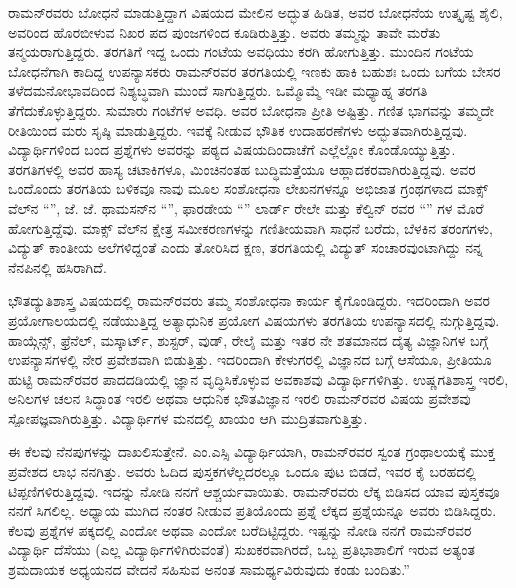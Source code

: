 ರಾಮನ್‍ರವರು ಬೋಧನೆ ಮಾಡುತ್ತಿದ್ದಾಗ ವಿಷಯದ ಮೇಲಿನ ಅದ್ಭುತ ಹಿಡಿತ, ಅವರ ಬೋಧನೆಯ ಉತ್ಕೃಷ್ಟ ಶೈಲಿ, ಅವರಿಂದ ಹೊರಬೀಳುವ ನಿಖರ ಪದ ಪುಂಜಗಳಿಂದ ಕೂಡಿರುತ್ತಿತ್ತು. ಅವರು ತಮ್ಮನ್ನು ತಾವೇ ಮರೆತು ತನ್ಮಯರಾಗುತ್ತಿದ್ದರು. ತರಗತಿಗೆ ಇದ್ದ ಒಂದು ಗಂಟೆಯ ಅವಧಿಯು ಕರಗಿ ಹೋಗುತ್ತಿತ್ತು. ಮುಂದಿನ ಗಂಟೆಯ ಬೋಧನೆಗಾಗಿ ಕಾದಿದ್ದ ಉಪನ್ಯಾಸಕರು ರಾಮನ್‍ರವರ ತರಗತಿಯಲ್ಲಿ ಇಣಕು ಹಾಕಿ ಬಹುಶಃ ಒಂದು ಬಗೆಯ ಬೇಸರ ತಳೆದ\break ಮನೋಭಾವದಿಂದ ನಿಶ್ಯಬ್ಧವಾಗಿ ಮುಂದೆ ಸಾಗುತ್ತಿದ್ದರು. ಒಮ್ಮೊಮ್ಮೆ ಇಡೀ ಮಧ್ಯಾಹ್ನ ತರಗತಿ ತೆಗೆದುಕೊಳ್ಳುತ್ತಿದ್ದರು. ಸುಮಾರು  ಗಂಟೆಗಳ ಅವಧಿ. ಅವರ ಬೋಧನಾ ಪ್ರೀತಿ ಅಷ್ಟಿತ್ತು. ಗಣಿತ ಭಾಗವನ್ನು ತಮ್ಮದೇ ರೀತಿಯಿಂದ ಮರು ಸೃಷ್ಠಿ ಮಾಡುತ್ತಿದ್ದರು. ಇವಕ್ಕೆ ನೀಡುವ ಭೌತಿಕ ಉದಾಹರಣೆಗಳು ಅದ್ಭುತವಾಗಿರುತ್ತಿದ್ದವು. ವಿದ್ಯಾರ್ಥಿಗಳಿಂದ ಬಂದ ಪ್ರಶ್ನೆಗಳು ಅವರನ್ನು ಪಠ್ಯದ ವಿಷಯದಿಂದಾಚೆಗೆ ಎಲ್ಲೆಲ್ಲೋ ಕೊಂಡೊಯ್ಯುತ್ತಿತ್ತು. ತರಗತಿಗಳಲ್ಲಿ ಅವರ ಹಾಸ್ಯ ಚಟಾಕಿಗಳೂ, ಮಿಂಚಿನಂತಹ ಬುದ್ಧಿಮತ್ತೆಯೂ ಆಹ್ಲಾದಕರವಾಗಿರುತ್ತಿದ್ದವು. ಅವರ ಒಂದೊಂದು ತರಗತಿಯ ಬಳಿಕವೂ ನಾವು ಮೂಲ ಸಂಶೋಧನಾ ಲೇಖನಗಳನ್ನೂ ಅಭಿಜಾತ ಗ್ರಂಥಗಳಾದ ಮಾಕ್ಸ್ ವೆಲ್‍ನ “”, ಜೆ. ಜೆ. ಥಾಮಸನ್‍ನ “”, ಫಾರಡೇಯ “” ಲಾರ್ಡ್ ರೇಲೇ ಮತ್ತು ಕೆಲ್ವಿನ್ ರವರ “” ಗಳ ಮೊರೆ ಹೋಗುತ್ತಿದ್ದೆವು. ಮಾಕ್ಸ್ ವೆಲ್‍ನ ಕ್ಷೇತ್ರ ಸಮೀಕರಣಗಳನ್ನು ಗಣಿತೀಯವಾಗಿ ಸಾಧನೆ ಬರೆದು, ಬೆಳಕಿನ ತರಂಗಗಳು, ವಿದ್ಯುತ್ ಕಾಂತೀಯ ಅಲೆಗಳಿದ್ದಂತೆ ಎಂದು ತೋರಿಸಿದ ಕ್ಷಣ, ತರಗತಿಯಲ್ಲಿ ವಿದ್ಯುತ್ ಸಂಚಾರವುಂಟಾಗಿದ್ದು ನನ್ನ ನೆನಪಿನಲ್ಲಿ ಹಸಿರಾಗಿದೆ.

ಭೌತದ್ಯುತಿಶಾಸ್ತ್ರ ವಿಷಯದಲ್ಲಿ ರಾಮನ್‍ರವರು ತಮ್ಮ ಸಂಶೋಧನಾ ಕಾರ್ಯ ಕೈಗೊಂಡಿದ್ದರು. ಇದರಿಂದಾಗಿ ಅವರ ಪ್ರಯೋಗಾಲಯದಲ್ಲಿ ನಡೆಯುತ್ತಿದ್ದ ಅತ್ಯಾಧುನಿಕ ಪ್ರಯೋಗ ವಿಷಯಗಳು ತರಗತಿಯ ಉಪನ್ಯಾಸದಲ್ಲಿ ನುಗ್ಗುತ್ತಿದ್ದವು. ಹಾಯ್ಗೆನ್ಸ್, ಫ್ರೆನೆಲ್, ಮಸ್ಕಾರ್ಟ್, ಶುಸ್ಟರ್, ವುಡ್, ರೇಲೈ ಮತ್ತು ಇತರ ನೇ ಶತಮಾನದ ದೈತ್ಯ ವಿಜ್ಞಾನಿಗಳ ಬಗ್ಗೆ ಉಪನ್ಯಾಸಗಳಲ್ಲಿ ನೇರ ಪ್ರವೇಶವಾಗಿ ಬಿಡುತ್ತಿತ್ತು. ಇದರಿಂದಾಗಿ ಕೇಳುಗರಲ್ಲಿ ವಿಜ್ಞಾನದ ಬಗ್ಗೆ ಆಸೆಯೂ, ಪ್ರೀತಿಯೂ ಹುಟ್ಟಿ ರಾಮನ್‍ರವರ ಪಾದದಡಿಯಲ್ಲಿ ಜ್ಞಾನ ವೃದ್ಧಿಸಿಕೊಳ್ಳುವ ಅವಕಾಶವು ವಿದ್ಯಾರ್ಥಿಗಳಿಗಿತ್ತು. ಉಷ್ಣಗತಿಶಾಸ್ತ್ರ ಇರಲಿ, ಅನಿಲಗಳ ಚಲನ ಸಿದ್ಧಾಂತ ಇರಲಿ ಅಥವಾ ಆಧುನಿಕ ಭೌತವಿಜ್ಞಾನ ಇರಲಿ ರಾಮನ್‍ರವರ ವಿಷಯ ಪ್ರವೇಶವು ಸ್ಪೋಪಜ್ಞವಾಗಿರುತ್ತಿತ್ತು. ವಿದ್ಯಾರ್ಥಿಗಳ ಮನದಲ್ಲಿ ಖಾಯಂ ಆಗಿ ಮುದ್ರಿತವಾಗುತ್ತಿತ್ತು.

ಈ ಕೆಲವು ನೆನಪುಗಳನ್ನು ದಾಖಲಿಸುತ್ತೇನೆ. ಎಂ.ಎಸ್ಸಿ ವಿದ್ಯಾರ್ಥಿಯಾಗಿ, ರಾಮನ್‍ರವರ ಸ್ವಂತ ಗ್ರಂಥಾಲಯಕ್ಕೆ ಮುಕ್ತ ಪ್ರವೇಶದ ಲಾಭ ನನಗಿತ್ತು. ಅವರು ಓದಿದ ಪುಸ್ತಕಗಳೆಲ್ಲದರಲ್ಲೂ ಒಂದೂ ಪುಟ ಬಿಡದೆ, ಇವರ ಕೈ ಬರಹದಲ್ಲಿ ಟಿಪ್ಪಣಿಗಳಿರುತ್ತಿದ್ದವು. ಇದನ್ನು ನೋಡಿ ನನಗೆ ಆಶ್ಚರ್ಯವಾಯಿತು. ರಾಮನ್‍ರವರು ಲೆಕ್ಕ ಬಿಡಿಸದ ಯಾವ ಪುಸ್ತಕವೂ ನನಗೆ ಸಿಗಲಿಲ್ಲ. ಅಧ್ಯಾಯ ಮುಗಿದ ನಂತರ ನೀಡುವ ಪ್ರತಿಯೊಂದು ಪ್ರಶ್ನೆ ಲೆಕ್ಕದ ಪ್ರಶ್ನೆಯನ್ನೂ ಅವರು ಬಿಡಿಸಿದ್ದರು. ಕೆಲವು ಪ್ರಶ್ನೆಗಳ ಪಕ್ಕದಲ್ಲಿ  ಎಂದೋ  ಅಥವಾ  ಎಂದೋ ಬರೆದಿಟ್ಟಿದ್ದರು. ಇಷ್ಟನ್ನು ನೋಡಿ ನನಗೆ ರಾಮನ್‍ರವರ ವಿದ್ಯಾರ್ಥಿ ದೆಸೆಯು (ಎಲ್ಲ ವಿದ್ಯಾರ್ಥಿಗಳಿಗಿರುವಂತೆ) ಸುಖಕರವಾಗಿರದೆ, ಒಬ್ಬ ಪ್ರತಿಭಾಶಾಲಿಗೆ ಇರುವ ಅತ್ಯಂತ ಶ್ರಮದಾಯಕ ಅಧ್ಯಯನದ ವೇದನೆ ಸಹಿಸುವ ಅನಂತ ಸಾಮರ್ಥ್ಯವಿರುವುದು ಕಂಡು ಬಂದಿತು.”

